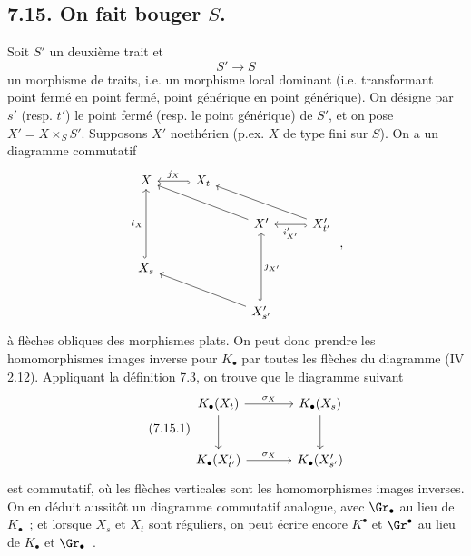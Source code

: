 
\subsection*{7.15. On fait bouger \(S\).}
Soit \(S'\) un deuxième trait et
\[
  S'\longrightarrow S
\]
un morphisme de traits, i.e. un morphisme local dominant (i.e. transformant point fermé en point fermé, point générique en point générique). On désigne par \(s'\) (resp. \(t'\)) le point fermé (resp. le point générique) de \(S'\), et on pose \(X'=X\times_SS'\). Supposons \(X'\) noethérien (p.ex. \(X\) de type fini sur \(S\)). On a un diagramme commutatif
\[
\begin{tikzcd}
X & X_t \arrow[l,hook,"j_X"'] & & \\
& & X' \arrow[ull] & X'_{t'} \arrow[l,hook,"i'_{X'}"] \arrow[ull] \\
X_s \arrow[uu,hook,"i_X"] & & & \\
& & X'_{s'} \arrow[uu,hook,"j_{X'}"'] \arrow[ull] &
\end{tikzcd}
\;,
\]
à flèches obliques des morphismes plats. On peut donc prendre les homomorphismes images inverse pour \(K_\bullet\) par toutes les flèches du diagramme (IV 2.12). Appliquant la définition 7.3, on trouve que le diagramme suivant
\begin{equation}\tag{7.15.1}
\begin{tikzcd}[column sep=large,row sep=large]
K_\bullet(X_t) \arrow[r,"\sigma_X"] \arrow[d] &
K_\bullet(X_s) \arrow[d]\\
K_\bullet(X'_{t'}) \arrow[r,"\sigma_X"] &
K_\bullet(X'_{s'})
\end{tikzcd}
\end{equation}
est commutatif, où les flèches verticales sont les homomorphismes images inverses. On en déduit aussitôt un diagramme commutatif analogue, avec \(\Gr_\bullet\) au lieu de \(K_\bullet\)~; et lorsque \(X_s\) et \(X_t\) sont réguliers, on peut écrire encore \(K^\bullet\) et \(\Gr^\bullet\) au lieu de \(K_\bullet\) et \(\Gr_\bullet\)~.

